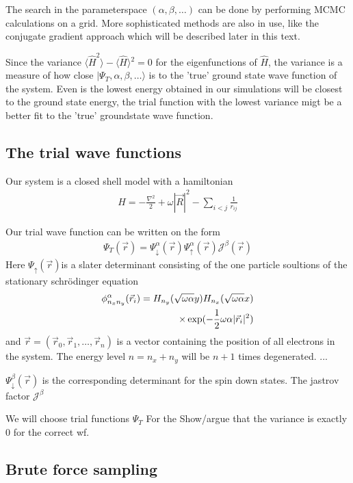 \documentclass[a4paper,10pt,twocolumn]{article} %
\newcommand{\ket}[1]{|#1\rangle{}}
\newcommand{\expec}[1]{\langle{}{#1}\rangle{}}
\begin{document}
The search in the parameterspace $(\alpha,\beta, \dots)$ can be done by performing MCMC calculations on a grid. 
More sophisticated methods are also in use, like the conjugate gradient approach which will be described later in this text.

Since the variance $\expec{\hat H^2}-\expec{\hat H}^2=0$ for the eigenfunctions of $\hat H$, the variance is a measure of how close 
$\ket{\Psi_T,\alpha,\beta,\dots}$ is to the 'true' ground state wave function of the system. Even is the lowest energy obtained in our simulations will be closest 
to the ground state energy, the trial function with the lowest variance migt be a better fit to the 'true' groundstate wave function.

\subsection{The trial wave functions}%

Our system is a closed shell model with a hamiltonian 
\begin{align} 
	\hat H = -\frac{\nabla ^2}2 + \omega |\vec R|^2 - \sum_{i<j}\frac1{r_{ij}} 
\end{align}

Our trial wave function can be written on the form
\begin{align}
	\Psi_T(\vec r) = \Psi_\downarrow^{\alpha}(\vec r) \Psi_\uparrow^\alpha(\vec r) \mathcal J^\beta(\vec r) 
\end{align}
Here $\Psi_\uparrow(\vec r)$is a slater determinant consisting of the one particle soultions of the stationary schrödinger equation
\begin{align}
	\phi_{n_xn_y}^\alpha(\vec r_i) = H_{n_y}(\sqrt{\omega\alpha}y)H_{n_x}(\sqrt{\omega\alpha}x)\notag\\
	\times \exp(-\frac12\omega\alpha|\vec r_i|^2) 
\end{align}
and $\vec r = (\vec r_0, \vec r_1,\dots,\vec r_n)$ is a vector containing the position of all electrons in the system.
The energy level $n=n_x+n_y$ will be $n+1$ times degenerated. ...


$\Psi_\downarrow^\beta(\vec r)$ is the corresponding determinant for the spin down states.
The jastrov factor $\mathcal J^\beta$
	
We will choose trial functions $\Psi_T$
For the 
Show/argue that the variance is exactly 0 for the correct wf.

\subsection{Brute force sampling}%
\end{document}
